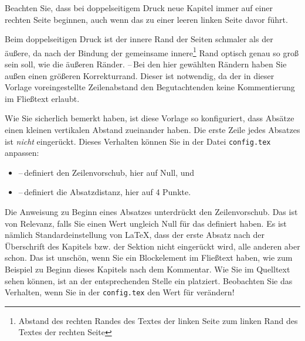 
Beachten Sie, dass bei doppelseitigem Druck neue Kapitel immer auf einer rechten Seite beginnen, auch wenn das zu einer leeren linken Seite davor führt.

Beim doppelseitigen Druck ist der innere Rand der Seiten schmaler als der äußere, da nach der Bindung der gemeinsame innere\footnote{Abstand des rechten Randes des Textes der linken Seite zum linken Rand des Textes der rechten Seite} Rand optisch genau so groß sein soll, wie die äußeren Ränder. --\,Bei den hier gewählten Rändern haben Sie außen einen größeren Korrekturrand. Dieser ist notwendig, da der in dieser Vorlage voreingestellte Zeilenabstand den Begutachtenden keine Kommentierung im Fließtext erlaubt.

Wie Sie sicherlich bemerkt haben, ist diese Vorlage so konfiguriert, dass Absätze einen kleinen vertikalen Abstand zueinander haben. Die erste Zeile jedes Absatzes ist \emph{nicht} eingerückt. Dieses Verhalten können Sie in der Datei \texttt{config.tex} anpassen:
\begin{itemize}
    \item {} --\,definiert den Zeilenvorschub, hier auf Null, und
    \item {} --\,definiert die Absatzdistanz, hier auf 4 Punkte.
\end{itemize}

Die Anweisung  zu Beginn eines Absatzes unterdrückt den Zeilenvorschub. Das ist von Relevanz, falls Sie einen Wert ungleich Null für das  definiert haben. Es ist nämlich Standardeinstellung von \LaTeX{}, dass der erste Absatz nach der Überschrift des Kapitels bzw. der Sektion nicht eingerückt wird, alle anderen aber schon. Das ist unschön, wenn Sie ein Blockelement im Fließtext haben, wie zum Beispiel zu Beginn dieses Kapitels nach dem Kommentar. Wie Sie im Quelltext sehen können, ist an der entsprechenden Stelle ein  platziert. Beobachten Sie das Verhalten, wenn Sie in der \texttt{config.tex} den Wert für  verändern!

